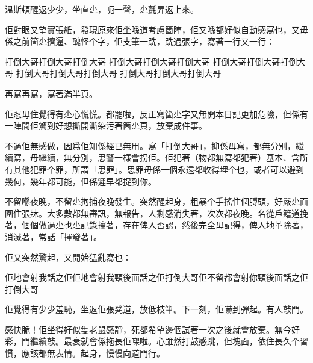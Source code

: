 溫斯頓醒返少少，坐直尐，呃一聲，尐氈昇返上來。

佢對眼又望實張紙，發現原來佢坐喺道考慮箇陣，佢又喺都好似自動感寫也，又毋係之前箇尐擠逼、醜怪个字，佢支筆一跣，跣過張字，寫著一行又一行：

	打倒大哥打倒大哥打倒大哥
	打倒大哥打倒大哥打倒大哥
	打倒大哥打倒大哥打倒大哥
	打倒大哥打倒大哥打倒大哥
	打倒大哥打倒大哥打倒大哥

再寫再寫，寫著滿半頁。

佢忍毋住覺得有尐心慌慌。都罷啦，反正寫箇尐字又無開本日記更加危險，但係有一陣間佢驚到好想撕開澌染污著箇尐頁，放棄成件事。

不過佢無感做，因爲佢知係經已無用。寫「打倒大哥」，抑係毋寫，都無分別，繼續寫，毋繼續，無分別，思警一樣會拐佢。佢犯著（物都無寫都犯著）基本、含所有其他犯罪个罪，所謂「思罪」。思罪毋係一個永遠都收得埋个也，或者可以避到幾何，幾年都可能，但係遲早都捉到你。

不留喺夜晚，不留尐拘捕夜晚發生。突然醒起身，粗暴个手搖住個膊頭，好嚴尐面圍住張牀。大多數都無審訊，無報告，人剩感消失著，次次都夜晚。名從戶籍道挽著，個個做過尐也尐記錄擦著，存在俾人否認，然後完全毋記得，俾人地革除著，消滅著，常話「揮發著」。

佢又突然驚起，又開始猛亂寫也：

佢地會射我話之佢佢地會射我頸後面話之佢打倒大哥佢不留都會射你頸後面話之佢打倒大哥

佢覺得有少少羞恥，坐返佢張凳道，放低枝筆。下一刻，佢嚇到彈起。有人敲門。

感快脆！佢坐得好似隻老鼠感靜，死都希望邊個試著一次之後就會放棄。無今好彩，門繼續敲。最衰就會係拖長佢㗎啦。心雖然打鼓感跳，但塊面，依住長久个習慣，應該都無表情。起身，慢慢向道門行。
